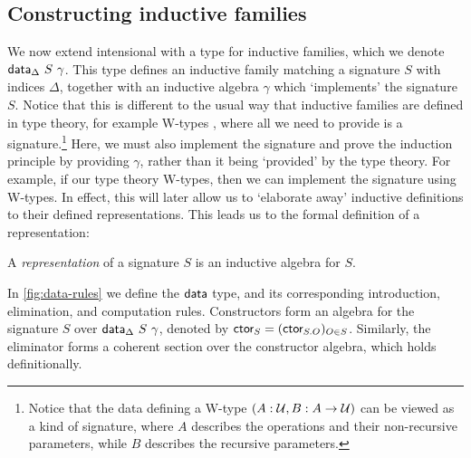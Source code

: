 \subsection{Constructing inductive families}\label{sub:constructing-inductive-families}

We now extend intensional \lambdamltt with a type for inductive families, which we
denote $\textsf{data}_\Delta\ S\ \gamma$. This type defines an inductive family
matching a signature $S$ with indices $\Delta$, together with an inductive
algebra $\gamma$ which `implements' the signature $S$. Notice that this is
different to the usual way that inductive families are defined in type theory,
for example W-types \cite{Abbott2004-va}, where all we need to provide is
a signature.\footnote{
Notice that the data defining a W-type $(A : \mathcal{U}, B : A \to \mathcal{U})$ can be viewed as a kind of signature, where $A$ describes the
operations and their non-recursive parameters, while $B$ describes the recursive parameters.}
Here, we must also implement the signature and prove
the induction principle by providing $\gamma$, rather than it being `provided' by
the type theory. For example, if our type theory W-types, then we can
implement the signature using W-types. In effect, this will later allow us to
`elaborate away' inductive definitions to their defined representations.
This leads us to the formal definition of a representation:
\begin{definition}
A \emph{representation} of a signature $S$ is an inductive algebra for $S$.
\end{definition}

In \cref{fig:data-rules} we define the $\textsf{data}$ type, and its corresponding
introduction, elimination, and computation rules.
Constructors form an algebra for the signature $S$ over
$\textsf{data}_\Delta\ S\ \gamma$, denoted by $\textsf{ctor}_S = (\textsf{ctor}_{S.O})_{O \in S}$.
Similarly, the eliminator forms a coherent section over the constructor algebra,
which holds definitionally.


